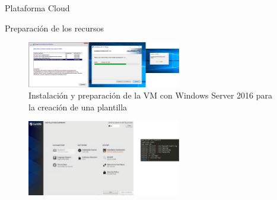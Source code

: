 \begin{subsection}{Plataforma Cloud}
\begin{subsubsection}{Preparación de los recursos}
    \begin{figure}[h]
        \centering
        \includegraphics[width=0.6\textwidth]{imaxes/pruebaconcepto/vrealize/instalador-windows.png}
        \caption{Instalación y preparación de la VM con Windows Server 2016 para la creación de una plantilla}
        \label{fig:windows-server-installing}
    \end{figure}
    \FloatBarrier
    \begin{figure}[h]
        \centering
        \includegraphics[width=0.6\textwidth]{imaxes/pruebaconcepto/vrealize/centos-installation.png}

\end{figure}
\end{subsubsection}
\end{subsection}
